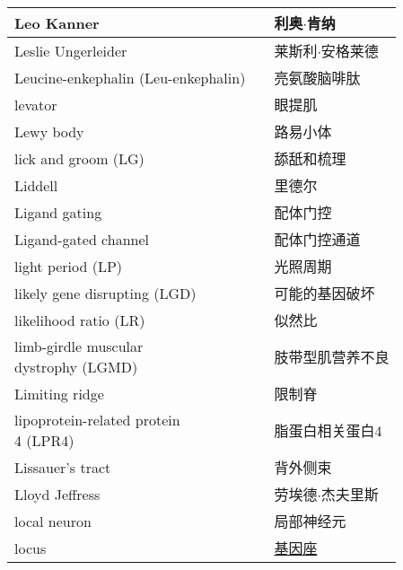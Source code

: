 \begin{longtable}{lll}
	\midrule
	Leo Kanner   && 利奥$\cdot$肯纳  \\
	
	\midrule
	Leslie Ungerleider   && 莱斯利$\cdot$安格莱德  \\
	
	\midrule
	Leucine-enkephalin (Leu-enkephalin)   && 亮氨酸脑啡肽  \\
	
	\midrule
	levator   && 眼提肌  \\
	
	\midrule
	Lewy body   && 路易小体  \\
	
	\midrule
	lick and groom (LG)  && 舔舐和梳理  \\
	
	\midrule
	Liddell  && 里德尔  \\
	
	\midrule
	Ligand gating  && 配体门控  \\
	
	\midrule
	Ligand-gated channel  && 配体门控通道  \\
	
	\midrule
	light period (LP)  && 光照周期  \\
	
	\midrule
	likely gene disrupting (LGD)  && 可能的基因破坏  \\
	
	\midrule
	likelihood ratio (LR) && 似然比  \\
	
	\midrule
	\makecell[l]{limb-girdle muscular \\dystrophy (LGMD)} && 肢带型肌营养不良  \\
	
	\midrule
	Limiting ridge && 限制脊  \\
	
	\midrule
	\makecell[l]{lipoprotein-related protein \\ 4 (LPR4)} && 脂蛋白相关蛋白4  \\
	
	\midrule
	Lissauer’s tract  && 背外侧束  \\
	
	\midrule
	Lloyd Jeffress  && 劳埃德$\cdot$杰夫里斯  \\
	
	\midrule
	local neuron  && 局部神经元  \\
	
	\midrule
	locus   && \href{https://baike.baidu.com/item/Locus/1628923}{基因座}  \\
	

\end{longtable}
